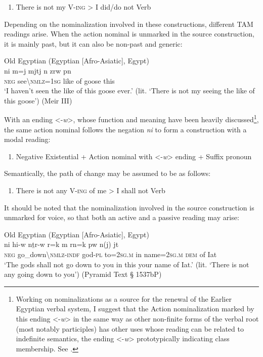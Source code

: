 \documentclass[output=paper,draft,draftmode,colorlinks,citecolor=brown]{langscibook}
\begin{document}
\begin{enumerate}[label=(\roman*), resume] %
	\item There is not my V-\textsc{ing} > I did/do not Verb
\end{enumerate}

Depending on the nominalization involved in these constructions, different TAM readings arise. When the action nominal is unmarked in the source construction, it is mainly past, but it can also be non-past and generic: 

\ea Old Egyptian (Egyptian [Afro-Asiatic], Egypt) \label{ex:AE6}\\
	\gll ni m{\ꜣ}=j mjtj n zrw pn\\
	\textsc{neg} see\textbackslash\textsc{nmlz=1sg} like of goose this\\
	\glt ‘I haven’t seen the like of this goose ever.’ (lit. ‘There is not my seeing the like of this goose’) (Meir III)
\z 

With an ending <-\textit{w}>, whose function and meaning have been heavily discussed\footnote{Working on nominalizations as a source for the renewal of the Earlier Egyptian verbal system, I suggest that the Action nominalization marked by this ending <-\textit{w}> in the same way as other non-finite forms of the verbal root (most notably participles) has other uses whose reading can be related to indefinite semantics, the ending <-\textit{w}> prototypically indicating class membership. See \citet{Oreal2017}.}, the same action nominal follows the negation \textit{ni} to form a construction with a modal reading:

\begin{enumerate}[label=(\roman*), resume] %
	\item Negative Existential + Action nominal with <-\textit{w}> ending + Suffix pronoun
\end{enumerate}

Semantically, the path of change may be assumed to be as follows: 

\begin{enumerate}[label=(\roman*), resume] %
	\item There is not any V-\textsc{ing} of me > I shall not Verb
\end{enumerate}

It should be noted that the nominalization involved in the source construction is unmarked for voice, so that both an active and a passive reading may arise:

\ea Old Egyptian (Egyptian [Afro-Asiatic], Egypt) \label{ex:AE9}\\
	\gll ni h{\ꜣ}i-w nṯr-w r=k m rn=k pw n(j) j{\ꜣ}t\\
	\textsc{neg} go\_down\textbackslash\textsc{nmlz-indf} god-\textsc{pl} to=\textsc{2sg.m} in name=\textsc{2sg.m} \textsc{dem} of Iat\\
		‘The gods shall not go down to you in this your name of Iat.’ (lit. ‘There is not any going down to you’) (Pyramid Text § 1537bP)
\z
\end{document}
